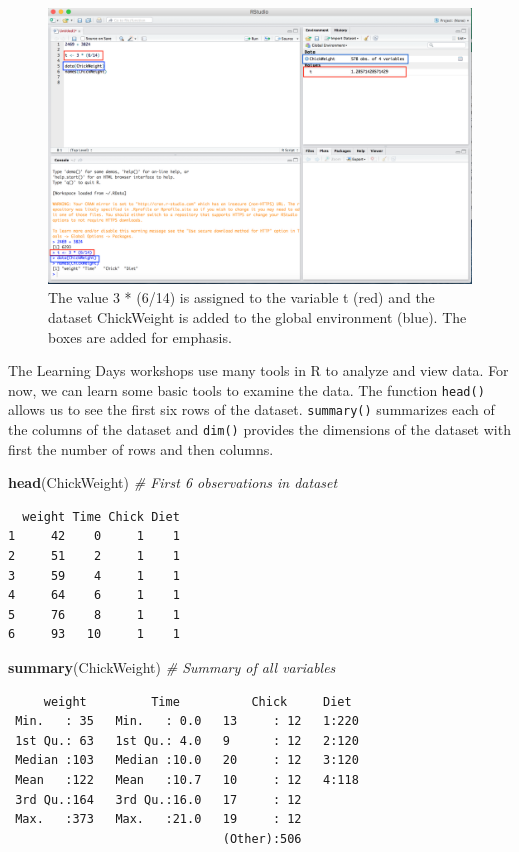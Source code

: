 \documentclass[12pt,]{book}
\newenvironment{Shaded}{\begin{snugshade}}{\end{snugshade}}
\newcommand{\CommentTok}[1]{\textcolor[rgb]{0.56,0.35,0.01}{\textit{#1}}}
\newcommand{\KeywordTok}[1]{\textcolor[rgb]{0.13,0.29,0.53}{\textbf{#1}}}
\newcommand{\NormalTok}[1]{#1}
\begin{document}
\begin{figure}
\includegraphics[width=0.6\linewidth]{Images/save_data} \caption{The value 3 * (6/14) is assigned to the variable t (red) and the dataset ChickWeight is added to the global environment (blue). The boxes are added for emphasis.}\label{fig:savedata}
\end{figure}

The Learning Days workshops use many tools in R to analyze and view data. For now, we can learn some basic tools to examine the data. The function \texttt{head()} allows us to see the first six rows of the dataset. \texttt{summary()} summarizes each of the columns of the dataset and \texttt{dim()} provides the dimensions of the dataset with first the number of rows and then columns.

\begin{Shaded}
\begin{Highlighting}[]
\KeywordTok{head}\NormalTok{(ChickWeight) }\CommentTok{# First 6 observations in dataset}
\end{Highlighting}
\end{Shaded}

\begin{verbatim}
  weight Time Chick Diet
1     42    0     1    1
2     51    2     1    1
3     59    4     1    1
4     64    6     1    1
5     76    8     1    1
6     93   10     1    1
\end{verbatim}

\begin{Shaded}
\begin{Highlighting}[]
\KeywordTok{summary}\NormalTok{(ChickWeight) }\CommentTok{# Summary of all variables}
\end{Highlighting}
\end{Shaded}

\begin{verbatim}
     weight         Time          Chick     Diet   
 Min.   : 35   Min.   : 0.0   13     : 12   1:220  
 1st Qu.: 63   1st Qu.: 4.0   9      : 12   2:120  
 Median :103   Median :10.0   20     : 12   3:120  
 Mean   :122   Mean   :10.7   10     : 12   4:118  
 3rd Qu.:164   3rd Qu.:16.0   17     : 12          
 Max.   :373   Max.   :21.0   19     : 12          
                              (Other):506          
\end{verbatim}
\end{document}
